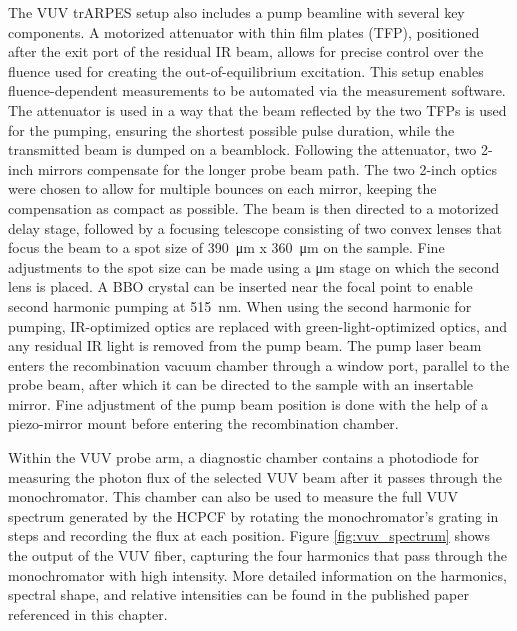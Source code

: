 The VUV trARPES setup also includes a pump beamline with several key components.
A motorized attenuator with thin film plates (TFP), positioned after the exit port of the residual IR beam, allows for precise control over the fluence used for creating the out-of-equilibrium excitation.
This setup enables fluence-dependent measurements to be automated via the measurement software.
The attenuator is used in a way that the beam reflected by the two TFPs is used for the pumping, ensuring the shortest possible pulse duration, while the transmitted beam is dumped on a beamblock.
Following the attenuator, two 2-inch mirrors compensate for the longer probe beam path.
The two 2-inch optics were chosen to allow for multiple bounces on each mirror, keeping the compensation as compact as possible.
The beam is then directed to a motorized delay stage, followed by a focusing telescope consisting of two convex lenses that focus the beam to a spot size of \qty{390}{\micro\meter} x \qty{360}{\micro\meter} on the sample.
Fine adjustments to the spot size can be made using a \unit{\micro\meter} stage on which the second lens is placed.
A BBO crystal can be inserted near the focal point to enable second harmonic pumping at \qty{515}{\nano\meter}.
When using the second harmonic for pumping, IR-optimized optics are replaced with green-light-optimized optics, and any residual IR light is removed from the pump beam.
The pump laser beam enters the recombination vacuum chamber through a window port, parallel to the probe beam, after which it can be directed to the sample with an insertable mirror.
Fine adjustment of the pump beam position is done with the help of a piezo-mirror mount before entering the recombination chamber.

Within the VUV probe arm, a diagnostic chamber contains a photodiode for measuring the photon flux of the selected VUV beam after it passes through the monochromator.
This chamber can also be used to measure the full VUV spectrum generated by the HCPCF by rotating the monochromator’s grating in steps and recording the flux at each position.
Figure \ref{fig:vuv_spectrum} shows the output of the VUV fiber, capturing the four harmonics that pass through the monochromator with high intensity.
More detailed information on the harmonics, spectral shape, and relative intensities can be found in the published paper referenced in this chapter.

